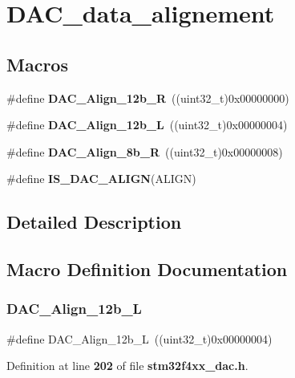 \section{D\+A\+C\+\_\+data\+\_\+alignement}
\label{group__DAC__data__alignement}
\subsection*{Macros}
\begin{DoxyCompactItemize}
\item 
\#define \textbf{ D\+A\+C\+\_\+\+Align\+\_\+12b\+\_\+R}~((uint32\+\_\+t)0x00000000)
\item 
\#define \textbf{ D\+A\+C\+\_\+\+Align\+\_\+12b\+\_\+L}~((uint32\+\_\+t)0x00000004)
\item 
\#define \textbf{ D\+A\+C\+\_\+\+Align\+\_\+8b\+\_\+R}~((uint32\+\_\+t)0x00000008)
\item 
\#define \textbf{ I\+S\+\_\+\+D\+A\+C\+\_\+\+A\+L\+I\+GN}(A\+L\+I\+GN)
\end{DoxyCompactItemize}


\subsection{Detailed Description}


\subsection{Macro Definition Documentation}
\mbox{\label{group__DAC__data__alignement_gaf3a46d37092eac0d4c9c1039e68208d4}} 
\subsubsection{D\+A\+C\+\_\+\+Align\+\_\+12b\+\_\+L}
{\footnotesize\ttfamily \#define D\+A\+C\+\_\+\+Align\+\_\+12b\+\_\+L~((uint32\+\_\+t)0x00000004)}



Definition at line \textbf{ 202} of file \textbf{ stm32f4xx\+\_\+dac.\+h}.

\mbox{\label{group__DAC__data__alignement_ga0f2a6fc71aaf90a27b0caf1bd06e73f2}} 
